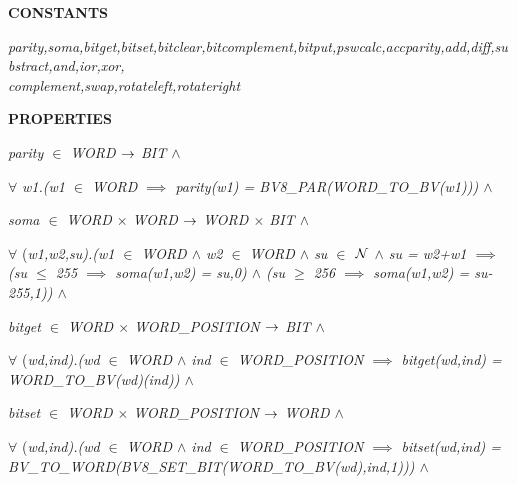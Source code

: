 \begin{sloppypar}
\bf CONSTANTS

\hspace*{0.10in}\it parity\rm ,\it soma\rm ,\it bitget\rm ,\it bitset\rm ,\it bitclear\rm ,\it bitcomplement\rm ,\it bitput\rm ,\it pswcalc\rm ,\it accparity\rm ,\it add\rm ,\it diff\rm ,\it substract\rm ,\it and\rm ,\it ior\rm ,\it xor\rm ,\it \\complement\rm ,\it swap\rm ,\it rotateleft\rm ,\it rotateright

\bf PROPERTIES

\hspace*{0.10in}\it parity $\in$  \it WORD  $\rightarrow$  \it BIT  $\land$ 

\hspace*{0.10in} $\forall$ \it w1\rm .\rm (\it w1 $\in$  \it WORD  $\implies$  \it parity\rm (\it w1\rm ) \rm = \it BV8\_PAR\rm (\it WORD\_TO\_BV\rm (\it w1\rm )\rm )\rm )  $\land$ 

\hspace*{0.10in}\it soma $\in$  \it WORD $\times$ \it WORD  $\rightarrow$  \it WORD $\times$ \it BIT  $\land$ 

\hspace*{0.10in} $\forall$ \rm (\it w1\rm ,\it w2\rm ,\it su\rm )\rm .\rm (\it w1 $\in$  \it WORD  $\land$  \it w2 $\in$  \it WORD  $\land$  \it su $\in$   $\mbox{${\cal N}$}$   $\land$  \it su \rm = \it w2\rm +\it w1  $\implies$  \rm (\it su $\leq$ \rm 2\rm 5\rm 5  $\implies$  \it soma\rm (\it w1\rm ,\it w2\rm ) \rm = \it su\rm ,\rm 0\rm )  $\land$  \rm (\it su $\geq$ \rm 2\rm 5\rm 6  $\implies$  \it soma\rm (\it w1\rm ,\it w2\rm ) \rm = \it su\rm -\rm 2\rm 5\rm 5\rm ,\rm 1\rm )\rm )  $\land$ 

\hspace*{0.10in}\it bitget $\in$  \it WORD $\times$ \it WORD\_POSITION  $\rightarrow$  \it BIT  $\land$ 

\hspace*{0.10in} $\forall$ \rm (\it wd\rm ,\it ind\rm )\rm .\rm (\it wd $\in$  \it WORD  $\land$  \it ind $\in$  \it WORD\_POSITION  $\implies$  \it bitget\rm (\it wd\rm ,\it ind\rm ) \rm = \it WORD\_TO\_BV\rm (\it wd\rm )\rm (\it ind\rm )\rm )  $\land$ 

\hspace*{0.10in}\it bitset $\in$  \it WORD $\times$ \it WORD\_POSITION  $\rightarrow$  \it WORD  $\land$ 

\hspace*{0.10in} $\forall$ \rm (\it wd\rm ,\it ind\rm )\rm .\rm (\it wd $\in$  \it WORD  $\land$  \it ind $\in$  \it WORD\_POSITION  $\implies$  \it bitset\rm (\it wd\rm ,\it ind\rm ) \rm = \it BV\_TO\_WORD\rm (\it BV8\_SET\_BIT\rm (\it WORD\_TO\_BV\rm (\it wd\rm )\rm ,\it ind\rm ,\rm 1\rm )\rm )\rm )  $\land$ 


\end{sloppypar}
